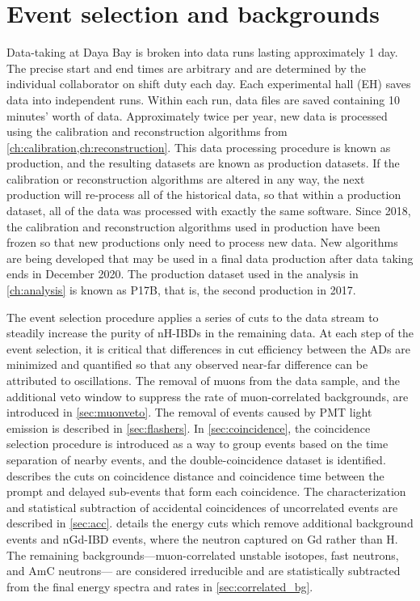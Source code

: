 \chapter{Event selection and backgrounds}
\label{ch:event_selection}

Data-taking at Daya Bay is broken into data runs
lasting approximately 1 day.
The precise start and end times are arbitrary
and are determined by the individual collaborator
on shift duty each day.
Each experimental hall (EH) saves data into independent runs.
Within each run, data files are saved containing 10 minutes' worth of data.
Approximately twice per year, new data is processed
using the calibration and reconstruction algorithms from
\cref{ch:calibration,ch:reconstruction}.
This data processing procedure is known as production, and the resulting datasets
are known as production datasets.
If the calibration or reconstruction algorithms are altered in any way,
the next production will re-process all of the historical data,
so that within a production dataset, all of the data was processed
with exactly the same software.
Since 2018, the calibration and reconstruction algorithms used in production have been
frozen so that new productions only need to process new data.
New algorithms are being developed that may be used
in a final data production after data taking ends in December 2020.
The production dataset used in the \thetaot{} analysis in \cref{ch:analysis} is known as P17B,
that is, the second production in 2017.

The event selection procedure applies a series of cuts to the data stream
to steadily increase the purity of nH-IBDs in the remaining data.
At each step of the event selection, it is critical that
differences in cut efficiency between the ADs are
minimized and quantified so that any observed near-far difference
can be attributed to \nuebar{} oscillations.
The removal of muons from the data sample, and the additional veto window
to suppress the rate of muon-correlated backgrounds,
are introduced in \cref{sec:muonveto}.
The removal of events caused by PMT light emission
is described in \cref{sec:flashers}.
In \cref{sec:coincidence}, the coincidence selection procedure
is introduced as a way to group events based on
the time separation of nearby events,
and the double-coincidence dataset is identified.
 describes the cuts on coincidence distance and coincidence time
between the prompt and delayed sub-events that form each coincidence.
The characterization and statistical subtraction of
accidental coincidences of uncorrelated events
are described in \cref{sec:acc}.
 details the energy cuts
which remove additional background events
and nGd-IBD events, where the neutron captured on Gd rather than H.
The remaining backgrounds---muon-correlated unstable isotopes,
fast neutrons, and AmC neutrons---
are considered irreducible and are statistically subtracted
from the final energy spectra and rates
in \cref{sec:correlated_bg}.

